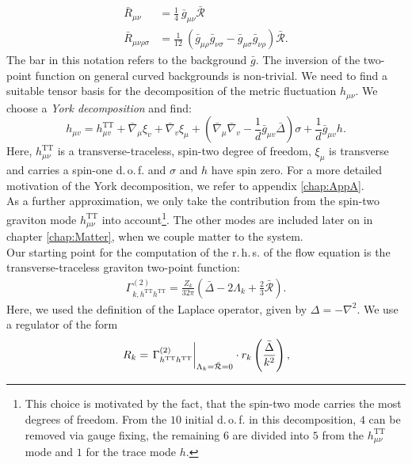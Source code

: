 \begin{equation}
\begin{aligned}
	\bar{R}_{\mu\nu} &= \frac{1}{4} \ \bar{g}_{\mu\nu} \bar{\mathcal{R}}\\[10pt]
	\bar{R}_{\mu\nu\rho\sigma} &= \frac{1}{12} \ (\bar{g}_{\mu\rho}\bar{g}_{\nu\sigma} - \bar{g}_{\mu\sigma}\bar{g}_{\nu\rho}) \bar{\mathcal{R}}.
\end{aligned}	
\end{equation}
The bar in this notation refers to the background $\bar{g}$. The inversion of the two-point function on general curved backgrounds is non-trivial. We need to find a suitable tensor basis for the decomposition of the metric fluctuation $h_{\mu\nu}$. We choose a \textit{York decomposition} and find:
\begin{equation}
	h_{\mu v}=h_{\mu v}^{\mathrm{TT}}+\bar{\nabla}_{\mu} \xi_{v}+\bar{\nabla}_{v} \xi_{\mu}+\left(\bar{\nabla}_{\mu} \bar{\nabla}_{v}-\frac{1}{d} \bar{g}_{\mu v} \bar{\Delta}\right) \sigma+\frac{1}{d} \bar{g}_{\mu v} h.
	\label{eqn:York}
\end{equation}
Here, $ h_{\mu\nu}^{\text{TT}}$ is a transverse-traceless, spin-two degree of freedom, $\xi_{\mu}$ is transverse and carries a spin-one d.\,o.\,f. and $\sigma$ and $h$ have spin zero. For a more detailed motivation of the York decomposition, we refer to appendix \ref{chap:AppA}.\\
As a further approximation, we only take the contribution from the spin-two graviton mode $h_{\mu\nu}^{\text{TT}}$ into account\footnote{This choice is motivated by the fact, that the spin-two mode carries the most degrees of freedom. From the $10$ initial d.\,o.\,f. in this decomposition, $4$ can be removed via gauge fixing, the remaining $6$ are divided into $5$ from the $h_{\mu\nu}^{\text{TT}}$ mode and $1$ for the trace mode $h$.}. The other modes are included later on in chapter \ref{chap:Matter}, when we couple matter to the system. \\
Our starting point for the computation of the r.\,h.\,s. of the flow equation is the transverse-traceless graviton two-point function:
\begin{align}
\Gamma_{k, h^{\text{TT}}h^{\text{TT}}}^{(2)} = \frac{Z_k}{32\pi}\left(\bar{\Delta} - 2\Lambda_k+\frac{2}{3}\bar{\mathcal{R}}\right).
\end{align}
Here, we used the definition of the Laplace operator, given by $\Delta = -\nabla^2$. We use a regulator of the form 
\begin{align}
R_k  = \eval{\Gamma_{h^{\text{TT}}h^{\text{TT}}}^{(2)}}_{\Lambda_k=\bar{\mathcal{R}}=0} \cdot r_k\left(\frac{\bar{\Delta}}{k^2}\right),
\end{align}
